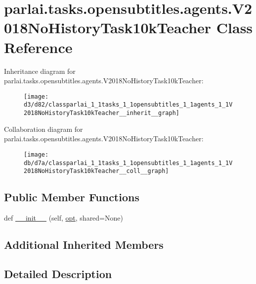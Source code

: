 \hypertarget{classparlai_1_1tasks_1_1opensubtitles_1_1agents_1_1V2018NoHistoryTask10kTeacher}{}\section{parlai.\+tasks.\+opensubtitles.\+agents.\+V2018\+No\+History\+Task10k\+Teacher Class Reference}
\label{classparlai_1_1tasks_1_1opensubtitles_1_1agents_1_1V2018NoHistoryTask10kTeacher}


Inheritance diagram for parlai.\+tasks.\+opensubtitles.\+agents.\+V2018\+No\+History\+Task10k\+Teacher\+:\nopagebreak
\begin{figure}[H]
\begin{center}
\leavevmode
\texttt{[image: d3/d82/classparlai\_1\_1tasks\_1\_1opensubtitles\_1\_1agents\_1\_1V2018NoHistoryTask10kTeacher\_\_inherit\_\_graph]}
\end{center}
\end{figure}


Collaboration diagram for parlai.\+tasks.\+opensubtitles.\+agents.\+V2018\+No\+History\+Task10k\+Teacher\+:\nopagebreak
\begin{figure}[H]
\begin{center}
\leavevmode
\texttt{[image: db/d7a/classparlai\_1\_1tasks\_1\_1opensubtitles\_1\_1agents\_1\_1V2018NoHistoryTask10kTeacher\_\_coll\_\_graph]}
\end{center}
\end{figure}
\subsection*{Public Member Functions}
\begin{DoxyCompactItemize}
\item 
def \hyperlink{classparlai_1_1tasks_1_1opensubtitles_1_1agents_1_1V2018NoHistoryTask10kTeacher_ace3fc69c7a84c37416b3b50b86735169}{\+\_\+\+\_\+init\+\_\+\+\_\+} (self, \hyperlink{classparlai_1_1core_1_1teachers_1_1FbDialogTeacher_af7a9ec497b9cd0292d7b8fa220da7c28}{opt}, shared=None)
\end{DoxyCompactItemize}
\subsection*{Additional Inherited Members}


\subsection{Detailed Description}


